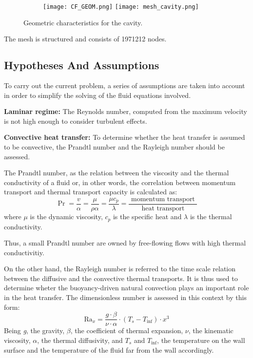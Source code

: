 \begin{figure}[h!]
	\centering
	\begin{subfigure}{\linewidth}
		\texttt{[image: CF\_GEOM.png]}\hfill
		\texttt{[image: mesh\_cavity.png]}	
		\label{BBPF_NCMF}
	\end{subfigure}
	\label{3.2fig}
	\caption{Geometric characteristics for the cavity.}
\end{figure} 
The mesh is structured and consists of 1971212 nodes.

\subsection{Hypotheses And Assumptions}

\setlength{\parindent}{0.5cm} To carry out the current problem, a series of assumptions are taken into account in order to simplify the solving of the fluid equations involved.

\textbf{Laminar regime:} The Reynolds number, computed from the maximum velocity is not high enough to consider turbulent effects. 

\textbf{Convective heat transfer:} To determine whether the heat transfer is assumed to be convective, the Prandtl number and the Rayleigh number should be assessed.

\noindent The Prandtl number, as the relation between the viscosity and the thermal conductivity of a fluid or, in other words, the correlation between momentum transport and thermal transport capacity is calculated as:
\begin{equation}
	\operatorname{Pr}=\frac{v}{\alpha}=\frac{\mu}{\rho \alpha}=\frac{\mu c_{p}}{\lambda}=\frac{\text { momentum transport }}{\text { heat transport }}
	\label{3.3}
\end{equation}
where $\mu$ is the dynamic viscosity, $c_{p}$ is the specific heat and $\lambda$ is the thermal conductivity.

\noindent Thus, a small Prandtl number are owned by free-flowing flows with high thermal conductivitiy.

\noindent On the other hand, the Rayleigh number is referred to the time scale relation between the diffusive and the convective thermal transports. It is thus used to determine wheter the buoyancy-driven natural convection plays an important role in the heat transfer. The dimensionless number is assessed in this context by this form:
\begin{equation}
	\mathrm{Ra}_{x}=\frac{g \cdot \beta}{\nu \cdot \alpha} \cdot\left(T_{s}-T_{\mathrm{inf}}\right) \cdot x^{3}
	\label{3.4}
\end{equation}
Being \textit{g}, the gravity, \textit{$\beta$}, the coefficient of thermal expansion, \textit{$\nu$}, the kinematic viscosity, \textit{$\alpha$}, the thermal diffusivity, and \textit{$T_{s}$} and \textit{$T_{\mathrm{inf}}$}, the temperature on the wall surface and the temperature of the fluid far from the wall accordingly.

